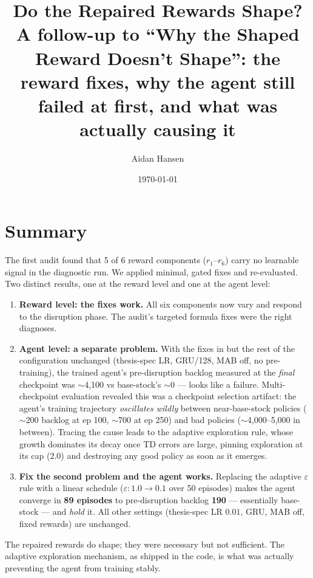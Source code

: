 \documentclass[11pt,letterpaper]{article}
\title{Do the Repaired Rewards Shape?\\
\large A follow-up to ``Why the Shaped Reward Doesn't Shape'': the reward fixes,
why the agent still failed at first, and what was actually causing it}
\author{Aidan Hansen}
\date{\today}
\begin{document}
\maketitle

\section*{Summary}

The first audit found that 5 of 6 reward components ($r_1$--$r_6$) carry no
learnable signal in the diagnostic run. We applied minimal, gated fixes and
re-evaluated. Two distinct results, one at the reward level and one at the agent
level:

\begin{enumerate}
  \item \textbf{Reward level: the fixes work.}  All six components now vary and
  respond to the disruption phase. The audit's targeted formula fixes were the
  right diagnoses.
  \item \textbf{Agent level: a separate problem.}  With the fixes in but the
  rest of the configuration unchanged (thesis-spec LR, GRU/128, MAB off,
  no pre-training), the trained agent's pre-disruption backlog measured at the
  \emph{final} checkpoint was $\sim$4{,}100 vs base-stock's $\sim$0 --- looks
  like a failure. Multi-checkpoint evaluation revealed this was a checkpoint
  selection artifact: the agent's training trajectory \emph{oscillates wildly}
  between near-base-stock policies ($\sim$200 backlog at ep 100, $\sim$700 at
  ep 250) and bad policies ($\sim$4{,}000--5{,}000 in between).  Tracing the
  cause leads to the adaptive exploration rule, whose growth dominates its
  decay once TD errors are large, pinning exploration at its cap (2.0) and
  destroying any good policy as soon as it emerges.
  \item \textbf{Fix the second problem and the agent works.}  Replacing the
  adaptive $\varepsilon$ rule with a linear schedule
  ($\varepsilon: 1.0 \to 0.1$ over 50 episodes) makes the agent converge in
  \textbf{89 episodes} to pre-disruption backlog \textbf{190} --- essentially
  base-stock --- and \emph{hold} it.  All other settings (thesis-spec LR
  $0.01$, GRU, MAB off, fixed rewards) are unchanged.
\end{enumerate}

The repaired rewards do shape; they were necessary but not sufficient. The
adaptive exploration mechanism, as shipped in the code, is what was actually
preventing the agent from training stably.
\end{document}
